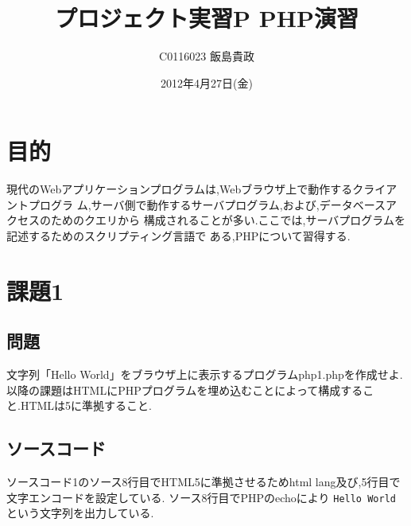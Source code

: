 \documentclass[a4j,10pt]{jsarticle}
\title{プロジェクト実習P PHP演習}
\author{C0116023 飯島貴政}
\date{2012年4月27日(金)}
\begin{document}
\maketitle


\section{目的}

現代のWebアプリケーションプログラムは,Webブラウザ上で動作するクライアントプログラ
ム,サーバ側で動作するサーバプログラム,および,データベースアクセスのためのクエリから
構成されることが多い.ここでは,サーバプログラムを記述するためのスクリプティング言語で
ある,PHPについて習得する.

\lstset{
    language = PHP,
    breaklines = true,
    breakindent = 10pt,
    basicstyle = \ttfamily\scriptsize,
    classoffset = 0,
    frame = TBrl,
    framesep = 5pt,
    numbers = left,
    stepnumber = 1,
    numberstyle = \tiny,
    tabsize = 4,
    captionpos = t
}

\section{課題1}

\subsection{問題}

文字列「Hello World」をブラウザ上に表示するプログラムphp1.phpを作成せよ.
以降の課題はHTMLにPHPプログラムを埋め込むことによって構成すること.HTMLは5に準拠すること.


\subsection{ソースコード}
ソースコード1のソース8行目でHTML5に準拠させるためhtml lang及び,5行目で文字エンコードを設定している.
ソース8行目でPHPのechoにより {\tt Hello World }という文字列を出力している.


\end{document}
